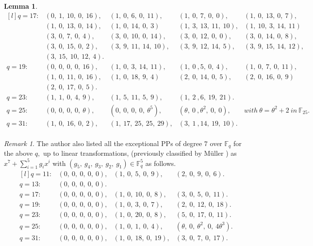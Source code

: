 \documentclass[12pt,a4wide, reqno]{amsart}
\newtheorem{lemma}{Lemma}
\theoremstyle{definition}
\theoremstyle{remark}
\newtheorem{remark}{Remark}
\numberwithin{equation}{section}
\begin{document}
\begin{lemma}
\begin{displaymath}
\begin{matrix*}[l]
q=17:& (0,~1,~10,~0,~16), &(1,~0,~6,~0,~11), & (1,~0,~7,~0,~0),&(1,~0,~13,~0,~7),\\
& (1,~0,~13,~0,~14),& (1,~0,~14,~0,~3) &(1,~3,~13,~11,~10),&(1,~10,~3,~14,~11)\\
& (3,~0,~7,~0,~4), &(3,~0,~10,~0,~14),& (3,~0,~12,~0,~0), &(3,~0,~14,~0,~8),\\
& (3,~0,~15,~0,~2), &(3,~9,~11,~14,~10), & (3,~9,~12,~14,~5),& (3,~9,~15,~14,~12),\\
&(3,~15,~10,~12,~4).&  &  & \\
q=19:& (0,~0,~0,~0,~16), &(1,~0,~3,~14,~11), & (1,~0~,5,~0,~4),&(1,~0,~7,~0,~11),\\
& (1,~0,~11,~0,~16),& (1,~0,~18,~9,~4) &(2,~0,~14,~0,~5),  &(2,~0,~16,~0,~9)\\
& (2,~0,~17,~0,~5). & & & \\
q=23:& (1,~1,~0,~4,~9), &(1,~5,~11,~5,~9), & (1,~2~,6,~19,~21).&  \\
q=25:& (0,~0,~0,~0,~\theta), &(0,~0,~0,~0,~\theta^5), & (\theta,~0~,\theta^2,~0,~0),& with~\theta=\theta^2+2~in~ \mathbb{F}_{25}.  \\
q=31:& (1,~0,~16,~0,~2), &(1,~17,~25,~25,~29), & (3,~1~,14,~19,~10).&   \\ 
\end{matrix*}
\end{displaymath}
\end{lemma}
\begin{remark} \label{r1}
    The author also listed  all the exceptional PPs of degree $7$ over $\mathbb{F}_q$ for the above $q,$ up to linear transformations, (previously classified by M\"{u}ller \cite[Theorem~4]{muller}) as $x^7+\sum_{i=1}^{5}g_ix^i$ with $(g_5,~g_4,~g_3,~g_2,~g_1)\in \mathbb{F}_q^5$ as follows.
    \begin{displaymath}
        \begin{matrix*}[l]
        q=11:&(0,~0,~0,~0,~0),& (1,~0,~5,~0,~9), & (2,~0,~9,~0,~6).\\
        q=13:&(0,~0,~0,~0,~0).&  & \\
        q=17:&(0,~0,~0,~0,~0),& (1,~0,~10,~0,~8), & (3,~0,~5,~0,~11).\\
        q=19:&(0,~0,~0,~0,~0),& (1,~0,~3,~0,~7), & (2,~0,~12,~0,~18).\\
        q=23:&(0,~0,~0,~0,~0),& (1,~0,~20,~0,~8), & (5,~0,~17,~0,~11).\\
         q=25:&(0,~0,~0,~0,~0),& (1,~0,~1,~0,~4), & (\theta,~0,~\theta^2,~0,~4\theta^3).\\
        q=31:&(0,~0,~0,~0,~0),& (1,~0,~18,~0,~19), & (3,~0,~7,~0,~17).\\
       
        \end{matrix*}
    \end{displaymath}
\end{remark}
\end{document}
